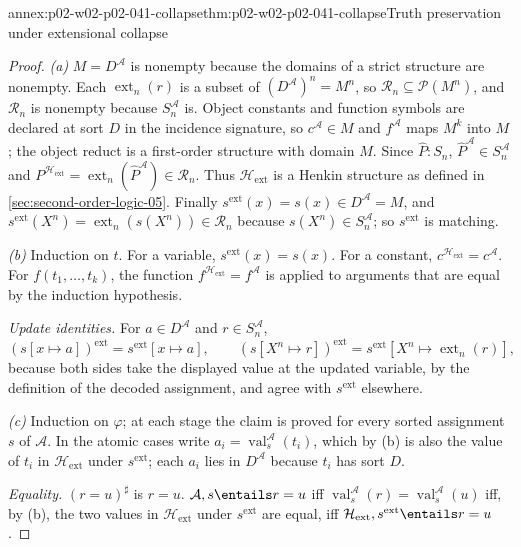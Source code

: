 \begin{annexitem}{annex:p02-w02-p02-041-collapse}{thm:p02-w02-p02-041-collapse}{Truth preservation under extensional collapse}
\begin{proof}
\emph{(a)}  \(M=D^{\mathcal A}\) is nonempty because the domains of a strict
structure are nonempty.  Each \(\operatorname{ext}_n(r)\) is a subset of
\((D^{\mathcal A})^n=M^n\), so \(\mathcal R_n\subseteq\mathcal P(M^n)\), and
\(\mathcal R_n\) is nonempty because \(S_n^{\mathcal A}\) is.  Object
constants and function symbols are declared at sort \(D\) in the incidence
signature, so \(c^{\mathcal A}\in M\) and \(f^{\mathcal A}\) maps \(M^k\) into
\(M\); the object reduct is a first-order structure with domain \(M\).  Since
\(\widehat P:S_n\), \(\widehat P^{\mathcal A}\in S_n^{\mathcal A}\) and
\(P^{\mathcal H_{\mathrm{ext}}}=\operatorname{ext}_n(\widehat P^{\mathcal
A})\in\mathcal R_n\).  Thus \(\mathcal H_{\mathrm{ext}}\) is a Henkin
structure as defined in \cref{sec:second-order-logic-05}.  Finally
\(s^{\mathrm{ext}}(x)=s(x)\in D^{\mathcal A}=M\), and
\(s^{\mathrm{ext}}(X^n)=\operatorname{ext}_n(s(X^n))\in\mathcal R_n\) because
\(s(X^n)\in S_n^{\mathcal A}\); so \(s^{\mathrm{ext}}\) is matching.

\emph{(b)}  Induction on \(t\).  For a variable,
\(s^{\mathrm{ext}}(x)=s(x)\).  For a constant,
\(c^{\mathcal H_{\mathrm{ext}}}=c^{\mathcal A}\).  For
\(f(t_1,\ldots,t_k)\), the function \(f^{\mathcal H_{\mathrm{ext}}}=f^{\mathcal
A}\) is applied to arguments that are equal by the induction hypothesis.

\emph{Update identities.}  For \(a\in D^{\mathcal A}\) and
\(r\in S_n^{\mathcal A}\),
\[
 (s[x\mapsto a])^{\mathrm{ext}}=s^{\mathrm{ext}}[x\mapsto a],
 \qquad
 (s[X^n\mapsto r])^{\mathrm{ext}}=s^{\mathrm{ext}}[X^n\mapsto\operatorname{ext}_n(r)],
\]
because both sides take the displayed value at the updated variable, by the
definition of the decoded assignment, and agree with \(s^{\mathrm{ext}}\)
elsewhere.

\emph{(c)}  Induction on \(\varphi\); at each stage the claim is proved for
every sorted assignment \(s\) of \(\mathcal A\).  In the atomic cases write
\(a_i=\operatorname{val}^{\mathcal A}_s(t_i)\), which by (b) is also the
value of \(t_i\) in \(\mathcal H_{\mathrm{ext}}\) under \(s^{\mathrm{ext}}\);
each \(a_i\) lies in \(D^{\mathcal A}\) because \(t_i\) has sort \(D\).

\emph{Equality.}  \((r=u)^\sharp\) is \(r=u\).
\(\mathcal A,s\entails r=u\) iff
\(\operatorname{val}^{\mathcal A}_s(r)=\operatorname{val}^{\mathcal A}_s(u)\)
iff, by (b), the two values in \(\mathcal H_{\mathrm{ext}}\) under
\(s^{\mathrm{ext}}\) are equal, iff
\(\mathcal H_{\mathrm{ext}},s^{\mathrm{ext}}\entails r=u\).


\end{proof}
\end{annexitem}
